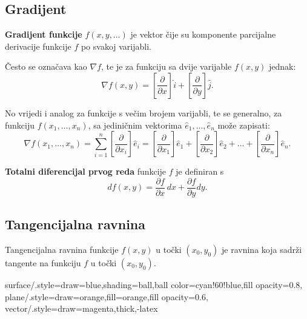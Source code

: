 \subsection{Gradijent}

\textbf{Gradijent funkcije} $f(x,y,\dots)$ je vektor čije su komponente
parcijalne derivacije funkcije $f$ po svakoj varijabli.

Često se označava kao $\nabla f$, te je za funkciju sa dvije varijable $f(x,y)$ jednak:
$$
  \nabla f(x,y) = \left[\frac{\partial}{\partial x}\right]\hat{i} + \left[\frac{\partial}{\partial y}\right]\hat{j}.
$$

No vrijedi i analog za funkcije s večim brojem varijabli, te se generalno, za
funkciju $f(x_1, \dots, x_n)$, sa jediničnim vektorima
$\hat{e}_1,\dots,\hat{e}_n$ može zapisati:
$$
  \nabla f(x_1, \dots, x_n) = \sum_{i=1}^n \left[\frac{\partial}{\partial x_i}\right]\hat{e}_i = \left[\frac{\partial}{\partial x_1}\right]\hat{e}_1 + \left[\frac{\partial}{\partial x_2}\right]\hat{e}_2 + \dots + \left[\frac{\partial}{\partial x_n}\right]\hat{e}_n.
$$

\textbf{Totalni diferencijal prvog reda} funkcije $f$ je definiran s
$$
df(x,y) = \frac{\partial f}{\partial x}\,dx + \frac{\partial f}{\partial y}dy.
$$

\subsection{Tangencijalna ravnina}

Tangencijalna ravnina funkcije $f(x,y)$ u točki $(x_0, y_0)$ je ravnina koja
sadrži tangente na funkciju $f$ u točki $(x_0, y_0)$.

\tikzset
{ surface/.style={draw=blue,shading=ball,ball color=cyan!60!blue,fill
  opacity=0.8}, plane/.style={draw=orange,fill=orange,fill opacity=0.6},
  vector/.style={draw=magenta,thick,-latex} }

